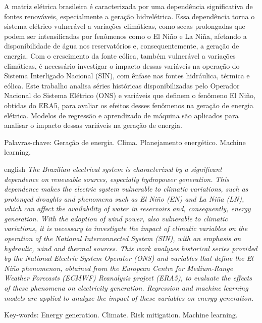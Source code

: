 \begin{resumo}
\noindent
A matriz elétrica brasileira é caracterizada por uma dependência significativa de fontes renováveis, especialmente a
geração hidrelétrica. Essa dependência torna o sistema elétrico vulnerável a variações climáticas, como secas 
prolongadas que podem ser intensificadas por fenômenos como o El Niño e La Niña, afetando a disponibilidade 
de água nos reservatórios e, consequentemente, a geração de energia. Com o crescimento da fonte eólica, também vulnerável a 
variações climáticas, é necessário investigar o impacto dessas variáveis na operação do Sistema Interligado Nacional 
(SIN), com ênfase nas fontes hidráulica, térmica e eólica. Este trabalho analisa séries históricas disponibilizadas pelo Operador Nacional 
do Sistema Elétrico (ONS) e variáveis que definem o fenômeno El Niño, obtidas do ERA5, para avaliar os efeitos desses fenômenos
na geração de energia elétrica. Modelos de regressão e aprendizado de máquina são aplicados para analisar
o impacto dessas variáveis na geração de energia.

\vspace{0.2cm}
\noindent
Palavras-chave: Geração de energia. Clima. Planejamento energético. Machine learning.
\end{resumo}

\begin{resumo}[Abstract]	
\begin{otherlanguage*}{english}
\noindent 
\textit{The Brazilian electrical system is characterized by a significant dependence on renewable sources, especially hydropower generation. 
This dependence makes the electric system vulnerable to climatic variations, such as prolonged droughts and phenomena such as
El Niño (EN) and La Niña (LN), which can affect the availability of water in reservoirs and, consequently, energy generation. 
With the adoption of wind power, also vulnerable to climatic variations, it is necessary to investigate the impact of 
climatic variables on the operation of the National Interconnected System (SIN), with an emphasis on hydraulic, wind and 
thermal sources. This work analyzes historical series provided by the National Electric System Operator (ONS) and variables 
that define the El Niño phenomenon, obtained from the European Centre for Medium-Range Weather Forecasts (ECMWF) 
Reanalysis project (ERA5), to evaluate the effects of these phenomena on electricity generation. 
Regression and machine learning models are applied to analyze the impact of these variables on energy generation.}

\vspace{0.2cm}
\noindent
Key-words: Energy generation. Climate. Risk mitigation. Machine learning.
\end{otherlanguage*}
\end{resumo}